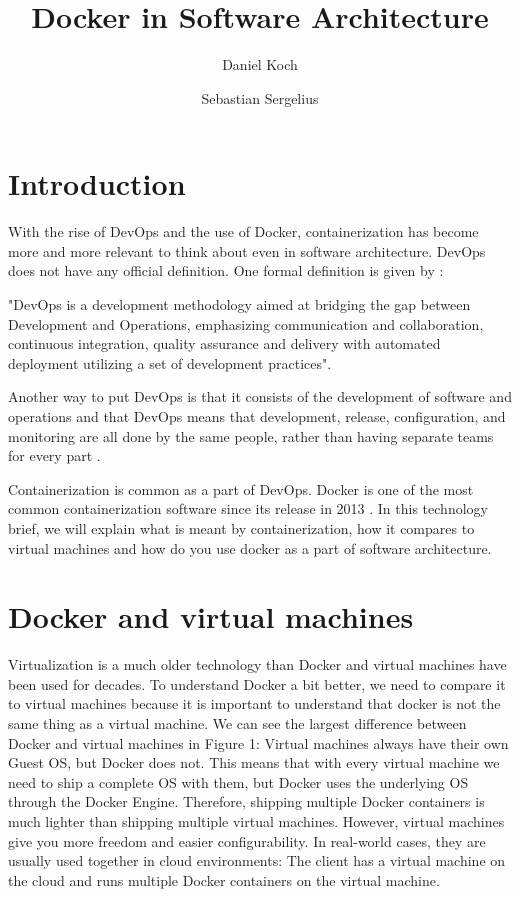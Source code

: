\documentclass[fleqn,12pt]{olplainarticle}
\title{Docker in Software Architecture}
\author[1]{Daniel Koch}
\author[2]{Sebastian Sergelius}
\affil[1]{daniel.koch@helsinki.fi}
\affil[2]{sebastian.sergelius@helsinki.fi}
\begin{document}
\flushbottom
\maketitle
\thispagestyle{empty}
\pagebreak
\tableofcontents
\section{Introduction}

With the rise of DevOps and the use of Docker, containerization has become more and more relevant to think about even in software architecture. DevOps does not have any official definition.
One formal definition is given by \cite{Jabbari_devops}: 
\begin{displayquote}
"DevOps is a development methodology aimed at bridging the gap between Development and Operations, emphasizing communication and collaboration, continuous integration, quality assurance and delivery with automated deployment utilizing a set of development practices".
\end{displayquote}
Another way to put DevOps is that it consists of the development of software and operations and that DevOps means that development, release, configuration, and monitoring are all done by the same people, rather than having separate teams for every part \citep{hy:DevOps_with_Docker}.

Containerization is common as a part of DevOps. Docker is one of the most common containerization software since its release in 2013 \citep{aquasec:orchestration}. In this technology brief, we will explain what is meant by containerization, how it compares to virtual machines and how do you use docker as a part of software architecture.


\section{Docker and virtual machines}

Virtualization is a much older technology than Docker and virtual machines have been used for decades. To understand Docker a bit better, we need to compare
it to virtual machines because it is important to understand that docker is not the same thing as a virtual machine. We can see the largest difference between Docker and virtual machines in Figure 1: Virtual machines always have their own Guest OS, but Docker does not. This means that with every virtual machine we need to ship a complete OS with them, but Docker uses the underlying OS through the Docker Engine. Therefore, shipping multiple Docker containers is much lighter than shipping multiple virtual machines. However, virtual machines give you more freedom and easier configurability. In real-world cases, they are usually used together in cloud environments: The client has a virtual machine on the cloud and runs multiple Docker containers on the virtual machine.
\end{document}
